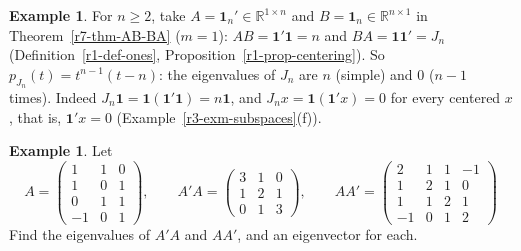 \documentclass[12pt]{article}
\newcommand{\R}{\mathbb R}
\newcommand{\one}{\mathbf 1}
\theoremstyle{definition}
\newtheorem{example}[theorem]{Example}
\begin{document}
\begin{example}\label{r7-exm-ones}
For \(n\geqslant2\), take \(A=\one_n'\in\R^{1\times n}\) and \(B=\one_n\in\R^{n\times1}\) in Theorem~\ref{r7-thm-AB-BA}
(\(m=1\)): \(AB=\one'\one=n\) and \(BA=\one\one'=J_n\) (Definition~\ref{r1-def-ones}, Proposition~\ref{r1-prop-centering}).
So \(p_{J_n}(t)=t^{n-1}(t-n)\): the eigenvalues of \(J_n\) are \(n\) (simple) and \(0\) (\(n-1\) times). Indeed
\(J_n\one=\one(\one'\one)=n\one\), and \(J_nx=\one(\one'x)=0\) for every centered \(x\), that is, \(\one'x=0\)
(Example~\ref{r3-exm-subspaces}(f)).
\end{example}

\begin{example}\label{r7-exm-ata}
Let
\[
A=\begin{pmatrix}1&1&0\\1&0&1\\0&1&1\\-1&0&1\end{pmatrix},\qquad
A'A=\begin{pmatrix}3&1&0\\1&2&1\\0&1&3\end{pmatrix},\qquad
AA'=\begin{pmatrix}2&1&1&-1\\1&2&1&0\\1&1&2&1\\-1&0&1&2\end{pmatrix}
\]
Find the eigenvalues of \(A'A\) and \(AA'\), and an eigenvector for each.


\end{example}
\end{document}
